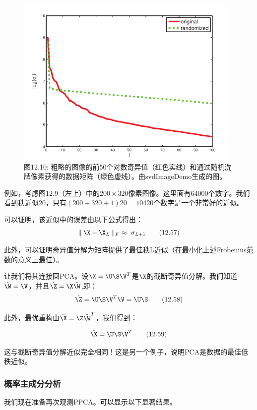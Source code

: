 \documentclass[a4paper]{article}
\begin{document}
\begin{figure}[h]
	\centering
	\includegraphics[width=0.7\linewidth]{fig/figure10}
	\caption*{图12.10: 粗略的图像的前50个对数奇异值（红色实线）和通过随机洗牌像素获得的数据矩阵（绿色虚线）。由svdImageDemo生成的图。  }
\end{figure}

例如，考虑图12.9（左上）中的$200\times 320$像素图像。这里面有64000个数字。我们看到秩近似20，只有$(200+320+1)20=10420$个数字是一个非常好的近似。


可以证明，该近似中的误差由以下公式得出：
\begin{equation}
	\parallel\X-\X_L\parallel_F\ \approx\ \sigma_{L+1}\tag{12.57}
\end{equation}

此外，可以证明奇异值分解为矩阵提供了最佳秩L近似（在最小化上述Frobenius范数的意义上最佳）。

让我们将其连接回PCA。设$\X=\U\S\V^T$是$\X$的截断奇异值分解。我们知道$\hat{\W}=\V$，并且$\hat{\Z}=\X\hat{\W}$,即：
\begin{equation}
	\hat{\Z}=\U\S\V^T\V=\U\S\tag{12.58}
\end{equation}

此外，最优重构由$\hat{\X}=\Z\hat{\W}^T$，我们得到：
 
\begin{equation}
	\hat{\X}=\U\S\V^T\tag{12.59}
\end{equation}

这与截断奇异值分解近似完全相同！这是另一个例子，说明PCA是数据的最佳低秩近似。

\clearpage
\subsubsection{概率主成分分析}

我们现在准备再次观测PPCA。可以显示以下显著结果。
\end{document}
